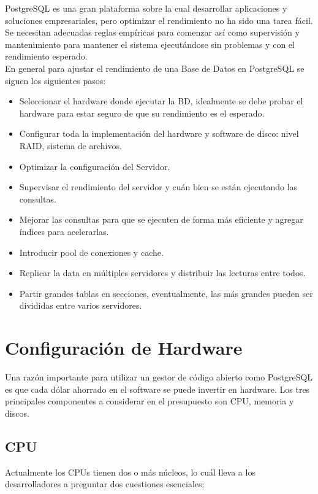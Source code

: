 PostgreSQL es una gran plataforma sobre la cual desarrollar aplicaciones y soluciones empresariales, pero optimizar el rendimiento no ha sido una tarea fácil. Se necesitan adecuadas reglas empíricas para comenzar así como supervisión y mantenimiento para mantener el sistema ejecutándose sin problemas y con el rendimiento esperado. \\

En general para ajustar el rendimiento de una Base de Datos en PostgreSQL se siguen los siguientes pasos:

\begin{itemize}
\item Seleccionar el hardware donde ejecutar la BD, idealmente se debe probar el hardware para estar seguro de que su rendimiento es el esperado.
\item Configurar toda la implementación del hardware y software de disco: nivel RAID, sistema de archivos.
\item Optimizar la configuración del Servidor.
\item Supervisar el rendimiento del servidor y cuán bien se están ejecutando las consultas.
\item Mejorar las consultas para que se ejecuten de forma más eficiente y agregar índices para acelerarlas.
\item Introducir pool de conexiones y cache.
\item Replicar la data en múltiples servidores y distribuir las lecturas entre todos.
\item Partir grandes tablas en secciones, eventualmente, las más grandes pueden ser divididas entre varios servidores.
\end{itemize}

\section{Configuración de Hardware}

Una razón importante para utilizar un gestor de código abierto como PostgreSQL es que cada dólar ahorrado en el software se puede invertir en hardware. Los tres principales componentes a considerar en el presupuesto son CPU, memoria y discos.\\

\subsection{CPU}

Actualmente los CPUs tienen dos o más núcleos, lo cuál lleva a los desarrolladores a preguntar dos cuestiones esenciales:

